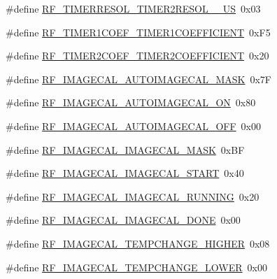 \begin{DoxyCompactItemize}
\#define \mbox{\hyperlink{sx1276_regs-_fsk_8h_a565fce371ac9705658e6932916c3768a}{R\+F\+\_\+\+T\+I\+M\+E\+R\+R\+E\+S\+O\+L\+\_\+\+T\+I\+M\+E\+R2\+R\+E\+S\+O\+L\+\_\+\_\+\+US}}~0x03
\item 
\#define \mbox{\hyperlink{sx1276_regs-_fsk_8h_a8718af4d7f55436a3c9376964556c42f}{R\+F\+\_\+\+T\+I\+M\+E\+R1\+C\+O\+E\+F\+\_\+\+T\+I\+M\+E\+R1\+C\+O\+E\+F\+F\+I\+C\+I\+E\+NT}}~0x\+F5
\item 
\#define \mbox{\hyperlink{sx1276_regs-_fsk_8h_a815c5b653da11e17f1973a36f7e83fc6}{R\+F\+\_\+\+T\+I\+M\+E\+R2\+C\+O\+E\+F\+\_\+\+T\+I\+M\+E\+R2\+C\+O\+E\+F\+F\+I\+C\+I\+E\+NT}}~0x20
\item 
\#define \mbox{\hyperlink{sx1276_regs-_fsk_8h_a3a8677759e03ebc17657dae4e83ee3e6}{R\+F\+\_\+\+I\+M\+A\+G\+E\+C\+A\+L\+\_\+\+A\+U\+T\+O\+I\+M\+A\+G\+E\+C\+A\+L\+\_\+\+M\+A\+SK}}~0x7F
\item 
\#define \mbox{\hyperlink{sx1276_regs-_fsk_8h_a89ea44c76e321418f15421277a3ec28f}{R\+F\+\_\+\+I\+M\+A\+G\+E\+C\+A\+L\+\_\+\+A\+U\+T\+O\+I\+M\+A\+G\+E\+C\+A\+L\+\_\+\+ON}}~0x80
\item 
\#define \mbox{\hyperlink{sx1276_regs-_fsk_8h_a1d28367a9a8e92bb14f6cdf8347d581d}{R\+F\+\_\+\+I\+M\+A\+G\+E\+C\+A\+L\+\_\+\+A\+U\+T\+O\+I\+M\+A\+G\+E\+C\+A\+L\+\_\+\+O\+FF}}~0x00
\item 
\#define \mbox{\hyperlink{sx1276_regs-_fsk_8h_a93dde986266fcd5b36345279f7eb2307}{R\+F\+\_\+\+I\+M\+A\+G\+E\+C\+A\+L\+\_\+\+I\+M\+A\+G\+E\+C\+A\+L\+\_\+\+M\+A\+SK}}~0x\+BF
\item 
\#define \mbox{\hyperlink{sx1276_regs-_fsk_8h_af1223b6f247482b1d7327c213b8b0864}{R\+F\+\_\+\+I\+M\+A\+G\+E\+C\+A\+L\+\_\+\+I\+M\+A\+G\+E\+C\+A\+L\+\_\+\+S\+T\+A\+RT}}~0x40
\item 
\#define \mbox{\hyperlink{sx1276_regs-_fsk_8h_a491baca7615a667462dbb91548b46e53}{R\+F\+\_\+\+I\+M\+A\+G\+E\+C\+A\+L\+\_\+\+I\+M\+A\+G\+E\+C\+A\+L\+\_\+\+R\+U\+N\+N\+I\+NG}}~0x20
\item 
\#define \mbox{\hyperlink{sx1276_regs-_fsk_8h_af062b902b4557ff0de124bb91de0cbc7}{R\+F\+\_\+\+I\+M\+A\+G\+E\+C\+A\+L\+\_\+\+I\+M\+A\+G\+E\+C\+A\+L\+\_\+\+D\+O\+NE}}~0x00
\item 
\#define \mbox{\hyperlink{sx1276_regs-_fsk_8h_a03320f56cee8ba418004acafcdd34249}{R\+F\+\_\+\+I\+M\+A\+G\+E\+C\+A\+L\+\_\+\+T\+E\+M\+P\+C\+H\+A\+N\+G\+E\+\_\+\+H\+I\+G\+H\+ER}}~0x08
\item 
\#define \mbox{\hyperlink{sx1276_regs-_fsk_8h_a63c7e38c8fe42a56c9e21141c63ed6fd}{R\+F\+\_\+\+I\+M\+A\+G\+E\+C\+A\+L\+\_\+\+T\+E\+M\+P\+C\+H\+A\+N\+G\+E\+\_\+\+L\+O\+W\+ER}}~0x00

\end{DoxyCompactItemize}
